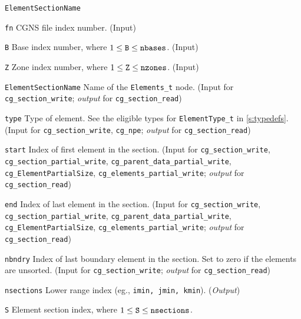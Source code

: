 \begin{Ventryi}{\texttt{ElementSectionName}}\raggedright
\item [\texttt{fn}]
      CGNS file index number.
      (\textcolor{input}{Input})
\item [\texttt{B}]
      Base index number, where $1 \leq \text{\texttt{B}} \leq \text{\texttt{nbases}}$.
      (\textcolor{input}{Input})
\item [\texttt{Z}]
      Zone index number, where $1 \leq \text{\texttt{Z}} \leq \text{\texttt{nzones}}$.
      (\textcolor{input}{Input})
\item [\texttt{ElementSectionName}]
      Name of the \texttt{Elements\_t} node.
      (\textcolor{input}{Input} for \texttt{cg\_section\_write};
      \textcolor{output}{\textit{output}} for \texttt{cg\_section\_read})
\item [\texttt{type}]
      Type of element.
      See the eligible types for \texttt{ElementType\_t} in \autoref{s:typedefs}.
      (\textcolor{input}{Input} for \texttt{cg\_section\_write}, \texttt{cg\_npe};
      \textcolor{output}{\textit{output}} for \texttt{cg\_section\_read})
\item [\texttt{start}]
      Index of first element in the section.
      (\textcolor{input}{Input} for
      \texttt{cg\_section\_write},
      \texttt{cg\_section\_partial\_write},
      \texttt{cg\_parent\_data\_partial\_write},
      \texttt{cg\_ElementPartialSize},
      \texttt{cg\_elements\_partial\_write};
      \textcolor{output}{\textit{output}} for
      \texttt{cg\_section\_read})
\item [\texttt{end}]
      Index of last element in the section.
      (\textcolor{input}{Input} for
      \texttt{cg\_section\_write},
      \texttt{cg\_section\_partial\_write},
      \texttt{cg\_parent\_data\_partial\_write},
      \texttt{cg\_ElementPartialSize},
      \texttt{cg\_elements\_partial\_write};
      \textcolor{output}{\textit{output}} for
      \texttt{cg\_section\_read})
\item [\texttt{nbndry}]
      Index of last boundary element in the section.
      Set to zero if the elements are unsorted.
      (\textcolor{input}{Input} for \texttt{cg\_section\_write};
      \textcolor{output}{\textit{output}} for \texttt{cg\_section\_read})
\item [\texttt{nsections}]
      Lower range index (eg., \texttt{imin, jmin, kmin}).
      (\textcolor{output}{\textit{Output}})
\item [\texttt{S}]
      Element section index, where $1 \leq \text{\texttt{S}} \leq \text{\texttt{nsections}}$.

\end{Ventryi}
